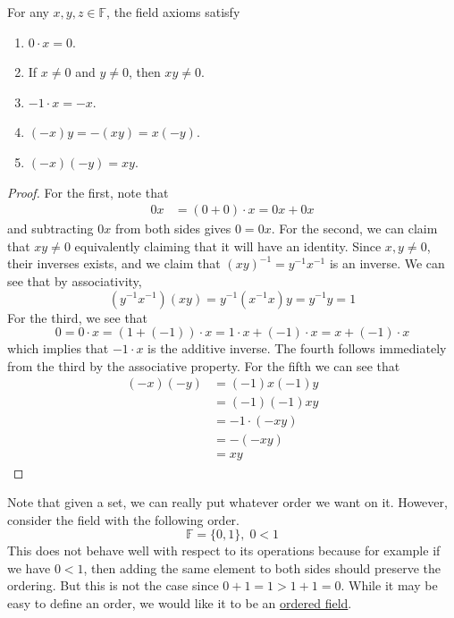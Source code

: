   \begin{lemma}
    \label{thm:properties-of-distribution}
    For any $x, y, z \in \mathbb{F}$, the field axioms satisfy 
    \begin{enumerate}
      \item $0 \cdot x = 0$.
      \item If $x \neq 0$ and $y \neq 0$, then $x y \neq 0$.
      \item $-1 \cdot x = -x$. 
      \item $(-x) y = - (xy) = x (-y)$. 
      \item $(-x) (-y) = xy$. 
    \end{enumerate}
  \end{lemma} 
  \begin{proof}
    For the first, note that 
    \begin{align}
      0 x & = (0 + 0) \cdot x = 0 x + 0x 
    \end{align}
    and subtracting $0x$ from both sides gives $0 = 0x$. For the second, we can claim that $xy \neq 0$ equivalently claiming that it will have an identity. Since $x, y \neq 0$, their inverses exists, and we claim that $(xy)^{-1} = y^{-1} x^{-1}$ is an inverse. We can see that by associativity, 
    \begin{equation}
      (y^{-1} x^{-1}) (xy) = y^{-1} (x^{-1} x) y = y^{-1} y = 1
    \end{equation} 
    For the third, we see that 
    \begin{equation}
      0 = 0 \cdot x = (1 + (-1)) \cdot x = 1 \cdot x + (-1) \cdot x = x + (-1) \cdot x 
    \end{equation}
    which implies that $-1 \cdot x$ is the additive inverse. The fourth follows immediately from the third by the associative property. For the fifth we can see that 
    \begin{align}
      (-x) (-y) & = (-1) x (-1) y && \tag{property 3} \\
                & = (-1) (-1) x y && \tag{$\times$ is commutative} \\
                & = -1 \cdot (-xy) && \tag{property 3} \\
                & = -(-xy) && \tag{property 3} \\
                & = xy && \tag{addition property 4}
    \end{align}
  \end{proof}

  Note that given a set, we can really put whatever order we want on it. However, consider the field with the following order. 
  \begin{equation}
    \mathbb{F} = \{0, 1\}, \; 0 < 1
  \end{equation} 
  This does not behave well with respect to its operations because for example if we have $0 < 1$, then adding the same element to both sides should preserve the ordering. But this is not the case since $0 + 1 = 1 > 1 + 1 = 0$. While it may be easy to define an order, we would like it to be an \hyperref[alg-def:ordered-field]{ordered field}. 

